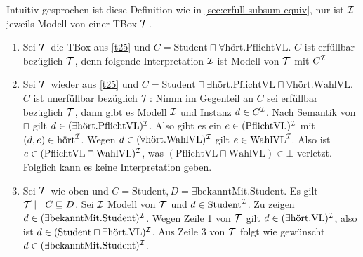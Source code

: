 Intuitiv gesprochen ist diese Definition wie in
\autoref{sec:erfull-subsum-equiv}, nur ist $\mathcal{I}$ jeweils Modell von einer TBox
$\mathcal{T}$.

\begin{tafel}\mbox{}
    \begin{enumerate}[label=\alph*)]
    \item Sei $\mathcal{T}$ die TBox aus \autoref{t25} und $C = \text{Student} \sqcap \forall \text{hört}.\text{PflichtVL}$. $C$ ist erfüllbar bezüglich $\mathcal{T}$, denn folgende Interpretation $\mathcal{I}$ ist Modell von $\mathcal{T}$ mit $C^{\mathcal{I}}$
    \begin{center}
    \end{center}
\item Sei $\mathcal{T}$ wieder aus \autoref{t25} und $C = \text{Student} \sqcap \exists \text{hört}.\text{PflichtVL} \sqcap \forall \text{hört}.\text{WahlVL}$.
    $C$ ist unerfüllbar bezüglich $\mathcal{T}$: Nimm im Gegenteil an $C$ sei erfüllbar bezüglich $\mathcal{T}$, dann gibt es Modell $\mathcal{I}$ und Instanz $d\in C^{\mathcal{I}}$. Nach Semantik von $\sqcap$ gilt $d \in (\exists \text{hört}.\text{PflichtVL})^{\mathcal{I}}$. Also gibt es ein $e \in (\text{PflichtVL})^{\mathcal{I}}$ mit $(d, e) \in \text{hört}^{\mathcal{I}}$. Wegen $d \in (\forall \text{hört}.\text{WahlVL})^{\mathcal{I}}$ gilt $e \in \text{WahlVL}^{\mathcal{I}}$. Also ist $e \in (\text{PflichtVL} \sqcap \text{WahlVL})^{\mathcal{I}}$, was $(\text{PflichtVL} \sqcap \text{WahlVL}) \in \bot$ verletzt. Folglich kann es keine Interpretation geben.
\item Sei $\mathcal{T}$ wie oben und $C = \text{Student}, D = \exists \text{bekanntMit}.\text{Student}$. Es gilt $\mathcal{T} \models C \sqsubseteq D$. Sei $\mathcal{I}$ Modell von $\mathcal{T}$ und $d \in \text{Student}^{\mathcal{I}}$. Zu zeigen $d \in (\exists \text{bekanntMit}.\text{Student})^{\mathcal{I}}$. Wegen Zeile 1 von $\mathcal{T}$ gilt $d \in (\exists \text{hört}.\text{VL})^{\mathcal{I}}$, also ist $d \in (\text{Student} \sqcap \exists \text{hört}.\text{VL})^{\mathcal{I}}$. Aus Zeile 3 von $\mathcal{T}$ folgt wie gewünscht $d \in (\exists \text{bekanntMit}.\text{Student})^{\mathcal{I}}$.
    \end{enumerate}
\end{tafel}

